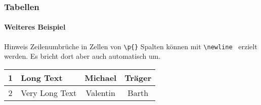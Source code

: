 

\begin{frame}[t]

\frametitle{Tabellen}
\framesubtitle{Weiteres Beispiel}

\begin{block}{Hinweis}
Zeilenumbrüche in Zellen von \texttt{\color{nounibaredI}\textbackslash p\color{black}\{\}} Spalten können mit \texttt{\color{nounibaredI}\textbackslash newline\color{black}}~ erzielt werden. Es bricht dort aber auch automatisch um.
\end{block}

\medskip

\begin{footnotesize}
\begin{ttfamily}

\end{ttfamily}
\end{footnotesize}

\medskip

\begin{tabular}{|c|p{20mm}|c|c|}
\hline
1 & Long \newline Text & Michael & Träger \\
\hline
2 & Very Long Text & Valentin & Barth \\
\hline
\end{tabular}

\end{frame}





